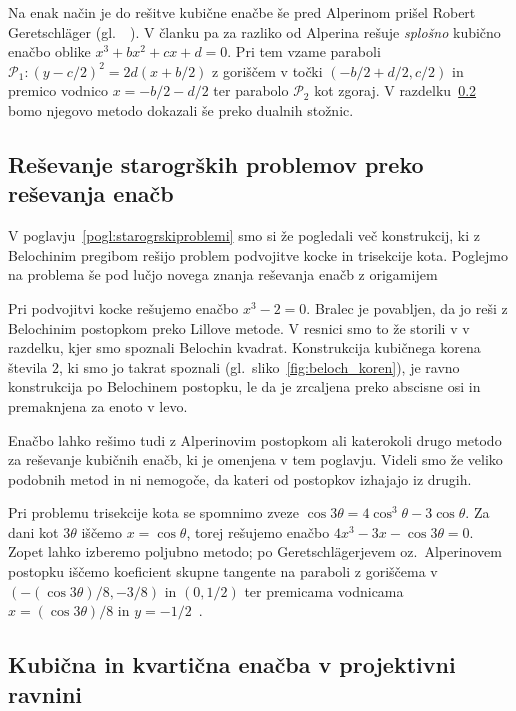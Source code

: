\begin{opomba}
    \label{opom:geret_metoda}
    Na enak način je do rešitve kubične enačbe še pred Alperinom prišel Robert Geretschläger (gl.\ ~\cite[368--369]{geret1995}). V članku pa za razliko od Alperina rešuje \emph{splošno} kubično enačbo oblike $x^3 + bx^2 + cx + d = 0$. Pri tem vzame paraboli $\mathcal{P}_1: (y-c/2)^2 = 2d(x+b/2)$ z goriščem v točki $(-b/2+d/2, c/2)$ in premico vodnico $x = -b/2-d/2$ ter parabolo $\mathcal{P}_2$ kot zgoraj. V razdelku~\ref{podpogl:afina_proj_enacbe} bomo njegovo metodo dokazali še preko dualnih stožnic.
\end{opomba}

\subsection{Reševanje starogrških problemov preko reševanja enačb}

V poglavju~\ref{pogl:starogrskiproblemi} smo si že pogledali več konstrukcij, ki z Belochinim pregibom rešijo problem podvojitve kocke in trisekcije kota. Poglejmo na problema še pod lučjo novega znanja reševanja enačb z origamijem

Pri podvojitvi kocke rešujemo enačbo $x^3 - 2 = 0$. Bralec je povabljen, da jo reši z Belochinim postopkom preko Lillove metode. V resnici smo to že storili v v razdelku, kjer smo spoznali Belochin kvadrat. Konstrukcija kubičnega korena števila $2$, ki smo jo takrat spoznali (gl.\ sliko~\ref{fig:beloch_koren}), je ravno konstrukcija po Belochinem postopku, le da je zrcaljena preko abscisne osi in premaknjena za enoto v levo.

Enačbo lahko rešimo tudi z Alperinovim postopkom ali katerokoli drugo metodo za reševanje kubičnih enačb, ki je omenjena v tem poglavju. Videli smo že veliko podobnih metod in ni nemogoče, da kateri od postopkov izhajajo iz drugih.

Pri problemu trisekcije kota se spomnimo zveze $\cos 3\theta = 4 \cos^3 \theta - 3 \cos \theta$. Za dani kot $3 \theta$ iščemo $x = \cos \theta$, torej rešujemo enačbo $4x^3-3x-\cos 3\theta=0$. Zopet lahko izberemo poljubno metodo; po Geretschlägerjevem oz.\ Alperinovem postopku iščemo koeficient skupne tangente na paraboli z goriščema v $(-(\cos 3 \theta) / 8, -3/8)$ in $(0, 1/2)$ ter premicama vodnicama $x = (\cos 3 \theta) / 8$ in $y = -1/2$~\cite[str.\ 370]{geret1995}.

\subsection{Kubična in kvartična enačba v projektivni ravnini}
\label{podpogl:afina_proj_enacbe}

